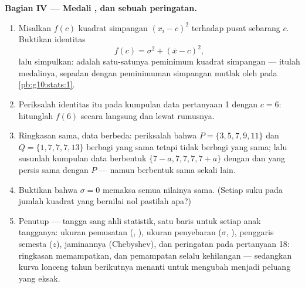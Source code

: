 \begin{problem}
\medskip
\noindent\textbf{Bagian IV --- Medali , dan sebuah peringatan.}
\begin{enumerate}[resume]
  \item Misalkan $f(c)$  kuadrat simpangan
        $(x_i - c)^2$ terhadap pusat sebarang $c$. Buktikan
        identitas
        \[
        f(c) = \sigma^2 + (\bar x - c)^2 ,
        \]
        lalu simpulkan:  adalah satu-satunya peminimum 
        kuadrat simpangan --- itulah medalinya, sepadan dengan peminimuman
        simpangan mutlak oleh  pada
        \cref{pb:g10:stats:1}.
  \item Periksalah identitas itu pada kumpulan data pertanyaan 1 dengan
        $c = 6$: hitunglah $f(6)$ secara langsung dan lewat rumusnya.
  \item Ringkasan sama, data berbeda: periksalah bahwa
        $P = \{3, 5, 7, 9, 11\}$ dan $Q = \{1, 7, 7, 7, 13\}$
        berbagi  yang sama tetapi tidak berbagi  yang sama; lalu
        susunlah kumpulan data berbentuk
        $\{7 - a, 7, 7, 7, 7 + a\}$ dengan  dan
         yang persis sama dengan $P$ --- namun berbentuk sama sekali lain.
  \item Buktikan bahwa $\sigma = 0$ memaksa semua nilainya sama. (Setiap suku
        pada jumlah kuadrat yang bernilai nol pastilah apa?)
  \item Penutup --- tangga sang ahli statistik, satu baris untuk setiap
        anak tangganya: ukuran pemusatan (, ), ukuran penyebaran
        ($\sigma$, ), penggaris semesta ($z$), jaminannya
        (Chebyshev), dan peringatan pada pertanyaan 18: ringkasan memampatkan,
        dan pemampatan selalu kehilangan --- sedangkan kurva lonceng tahun
        berikutnya menanti untuk mengubah  menjadi peluang yang eksak.

\end{enumerate}
\end{problem}
